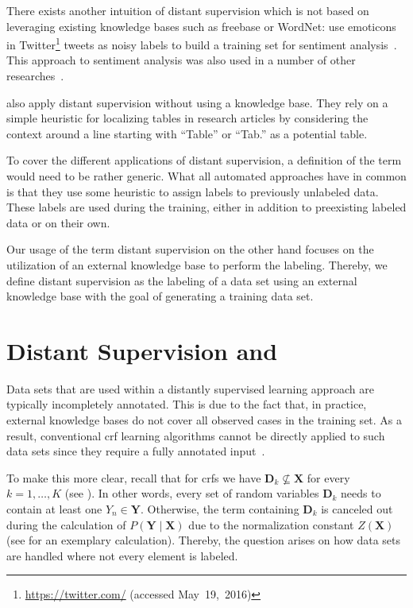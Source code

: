 \bigskip

There exists another intuition of \gls{distant supervision} which is not based on leveraging existing knowledge bases such as \gls{freebase} or WordNet:
\citet{go2009twitter} use emoticons in Twitter\footnote{\url{https://twitter.com/} (accessed May~19,~2016)} tweets as noisy labels to build a training set for sentiment analysis~\citep{go2009twitter}.
This approach to sentiment analysis was also used in a number of other researches~\citep{purver2012experimenting,marchetti2012learning,suttles2013distant}.

\citet{fan2015detecting} also apply distant supervision without using a knowledge base.
They rely on a simple heuristic for localizing tables in research articles by considering the context around a line starting with ``Table'' or ``Tab.'' as a potential table.

\bigskip

To cover the different applications of \gls{distant supervision}, a definition of the term would need to be rather generic.
What all automated approaches have in common is that they use some heuristic to assign labels to previously unlabeled data. These labels are used during the training, either in addition to preexisting labeled data or on their own.

Our usage of the term \gls{distant supervision} on the other hand focuses on the utilization of an external knowledge base to perform the labeling.
Thereby, we define \gls{distant supervision} as the labeling of a data set using an external knowledge base with the goal of generating a training data set.

\section{Distant Supervision and }

Data sets that are used within a distantly supervised learning approach are typically incompletely annotated.
This is due to the fact that, in practice, external knowledge bases do not cover all observed cases in the training set.
As a result, conventional \gls{crf} learning algorithms cannot be directly applied to such data sets since they require a fully annotated input~\citep{tsuboi2008training}.

To make this more clear, recall that for \glspl{crf} we have $\mathbf{D}_k\not\subseteq\mathbf{X}$ for every $k=1,\dots,K$ (see ).
In other words, every set of \glspl{random variable} $\mathbf{D}_k$ needs to contain at least one $Y_n\in\mathbf{Y}$.
Otherwise, the term containing $\mathbf{D}_k$ is canceled out during the calculation of $P(\mathbf{Y}\mid\mathbf{X})$ due to the normalization constant $Z(\mathbf{X})$ (see  for an exemplary calculation).
Thereby, the question arises on how data sets are handled where not every element is labeled.

